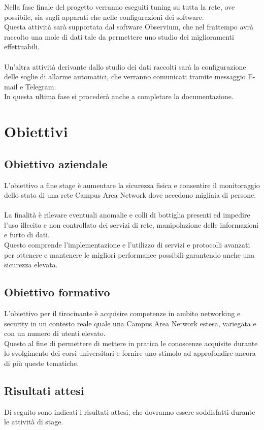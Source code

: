 \documentclass[Tesi.tex]{subfiles}
\begin{document}
Nella fase finale del progetto verranno eseguiti tuning su tutta la rete, ove possibile, sia sugli apparati che nelle configurazioni dei software. \\
Questa attività sarà supportata dal software Observium, che nel frattempo avrà raccolto una mole di dati tale da permettere uno studio dei miglioramenti effettuabili.\\\\
Un'altra attività derivante dallo studio dei dati raccolti sarà la configurazione delle soglie di allarme automatici, che verranno comunicati tramite messaggio E-mail e Telegram. \\
In questa ultima fase si procederà anche a completare la documentazione. 

\newpage
\section{Obiettivi}
\subsection{Obiettivo aziendale}
L'obiettivo a fine stage è aumentare la sicurezza fisica e consentire il monitoraggio dello stato di una rete Campus Area Network dove accedono migliaia di persone. \\\\
La finalità è rilevare eventuali anomalie e colli di bottiglia presenti ed impedire l'uso illecito e non controllato dei servizi di rete, manipolazione delle informazioni e furto di dati. \\
Questo comprende l'implementazione e l'utilizzo di servizi e protocolli avanzati per ottenere e mantenere le migliori performance possibili garantendo anche una sicurezza elevata.

\subsection{Obiettivo formativo}
L'obiettivo per il tirocinante è acquisire competenze in ambito networking e security in un contesto reale quale una Campus Area Network estesa, variegata e con un numero di utenti elevato. \\
Questo al fine di permettere di mettere in pratica le conoscenze acquisite durante lo svolgimento dei corsi universitari e fornire uno stimolo ad approfondire ancora di più queste tematiche.

\newpage
\subsection{Risultati attesi}
Di seguito sono indicati i risultati attesi, che dovranno essere soddisfatti durante le attività di stage.
\end{document}
